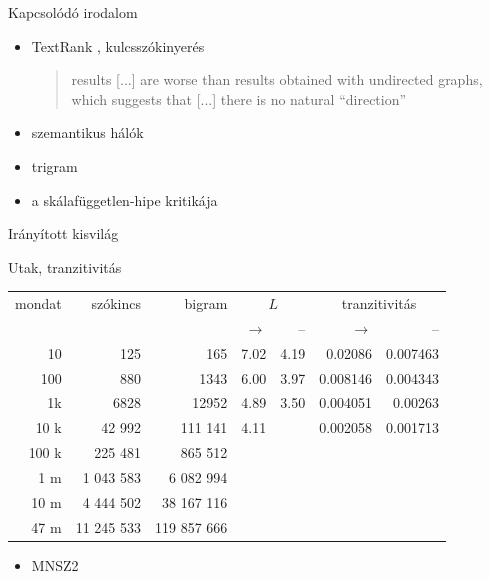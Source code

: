 \documentclass{beamer}
\newlength{\onecolwid}
\begin{document}
\begin{frame}[t]
\begin{columns}[t]
\begin{column}{\onecolwid}

      \begin{block}{Kapcsolódó irodalom}
        \begin{itemize}
          \item TextRank \citep{mihalcea2004textrank}, kulcsszókinyerés
            \begin{quote}
              results [...] are worse than results obtained with undirected
                graphs, which suggests that [...] there is no natural “direction”
            \end{quote}
          \item szemantikus hálók \citep{steyvers2005large}
          \item trigram \citep{cancho2001thesmall}
          \item a skálafüggetlen-hipe kritikája
            \citep{willinger2009mathematics}
        \end{itemize}
      \end{block}
      

        \begin{alertblock}{Irányított kisvilág}  \end{alertblock} 
        \begin{block}{Utak, tranzitivitás} 
      \begin{table}
      \begin{tabular}{rrrrrrr}
        \toprule
        mondat & szókincs & bigram & \multicolumn{2}{c}{$L$} & \multicolumn{2}{c}{tranzitivitás} \\
        &&&$\rightarrow$&--&$\rightarrow$&--\\
        \midrule
        10 & 125 & 165 & 7.02 & 4.19 & 0.02086 & 0.007463 \\
        100 & 880 & 1343 & 6.00 & 3.97 & 0.008146 & 0.004343 \\
        1k & 6828 & 12952 & 4.89 & 3.50 & 0.004051 & 0.00263 \\ 
        10 k	&     42 992  &     111 141 & 4.11 && 0.002058 & 0.001713 \\
        100 k	&    225 481  &     865 512 & \\
        1 m	  &  1 043 583  &   6 082 994 \\
        10 m	&  4 444 502  &  38 167 116 \\
        47 m  & 11 245 533  & 119 857 666 \\
        \bottomrule
      \end{tabular}
      \end{table}
          \begin{itemize}
            \item MNSZ2 \citep{oravecz2014hungarian}
          \end{itemize}
        \end{block}


\end{column}
\end{columns}
\end{frame}
\end{document}
